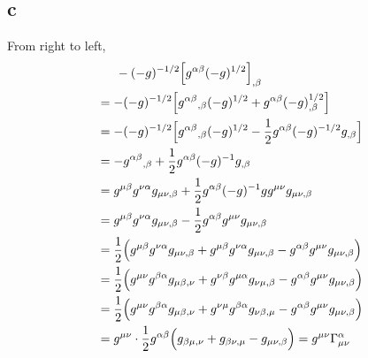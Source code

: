 \documentclass{article}
\begin{document}
\subsection*{c}
From right to left,
\begin{align*}
&\indent -(-g)^{-1/2}\Big[g^{\alpha\beta}(-g)^{1/2}\Big]_{,\beta} \\
&= -(-g)^{-1/2}\Big[g^{\alpha\beta}{}_{,\beta}(-g)^{1/2} + g^{\alpha\beta}(-g)^{1/2}_{,\beta} \Big]\\
&= -(-g)^{-1/2}\Big[g^{\alpha\beta}{}_{,\beta}(-g)^{1/2} - \frac{1}{2}g^{\alpha\beta}(-g)^{-1/2}g_{,\beta} \Big]\\
&= - g^{\alpha\beta}{}_{,\beta} + \frac{1}{2}g^{\alpha\beta}(-g)^{-1}g_{,\beta}\\
&= g^{\mu\beta}g^{\nu\alpha}g_{\mu\nu,\beta} + \frac{1}{2}g^{\alpha\beta}(-g)^{-1}gg^{\mu\nu}g_{\mu\nu,\beta}\\
&= g^{\mu\beta}g^{\nu\alpha}g_{\mu\nu,\beta} - \frac{1}{2}g^{\alpha\beta}g^{\mu\nu}g_{\mu\nu,\beta}\\
&= \frac{1}{2}\Big(g^{\mu\beta}g^{\nu\alpha}g_{\mu\nu,\beta}  + g^{\mu\beta}g^{\nu\alpha}g_{\mu\nu,\beta} - g^{\alpha\beta}g^{\mu\nu}g_{\mu\nu,\beta} \Big) \\
&= \frac{1}{2}\Big(g^{\mu\nu}g^{\beta\alpha}g_{\mu\beta, \nu}  + g^{\nu\beta}g^{\mu\alpha}g_{\nu\mu,\beta} - g^{\alpha\beta}g^{\mu\nu}g_{\mu\nu,\beta} \Big) \\
&= \frac{1}{2}\Big(g^{\mu\nu}g^{\beta\alpha}g_{\mu\beta, \nu}  + g^{\nu\mu}g^{\beta\alpha}g_{\nu\beta,\mu} - g^{\alpha\beta}g^{\mu\nu}g_{\mu\nu,\beta} \Big) \\
&= g^{\mu\nu}\cdot \frac{1}{2}g^{\alpha\beta} \Big(g_{\beta\mu, \nu}  +g_{\beta\nu,\mu} - g_{\mu\nu,\beta} \Big)
= g^{\mu\nu} \Gamma^\alpha_{\mu\nu}
\end{align*}
\end{document}
